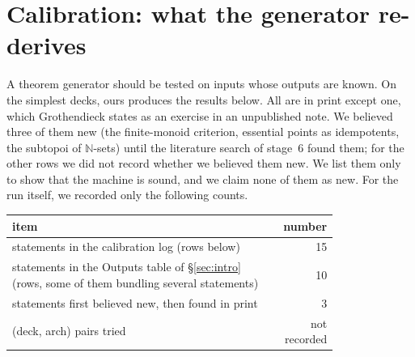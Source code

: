 \section{Calibration: what the generator re-derives}\label{sec:calibration}

A theorem generator should be tested on inputs whose outputs are known. On the simplest decks, ours produces the results below. All are in print except one, which Grothendieck states as an exercise in an unpublished note. We believed three of them new (the finite-monoid criterion, essential points as idempotents, the subtopoi of $\mathbb N$-sets) until the literature search of stage~6 found them; for the other rows we did not record whether we believed them new. We list them only to show that the machine is sound, and we claim none of them as new. For the run itself, we recorded only the following counts.

\begin{center}\small
\begin{tabular}{@{}p{0.8\linewidth}r@{}}
\toprule
item & number\\
\midrule
statements in the calibration log (rows below) & 15\\
statements in the Outputs table of \S\ref{sec:intro} (rows, some of them bundling several statements) & 10\\
statements first believed new, then found in print & 3\\
(deck, arch) pairs tried & not recorded\\
\bottomrule
\end{tabular}
\end{center}

